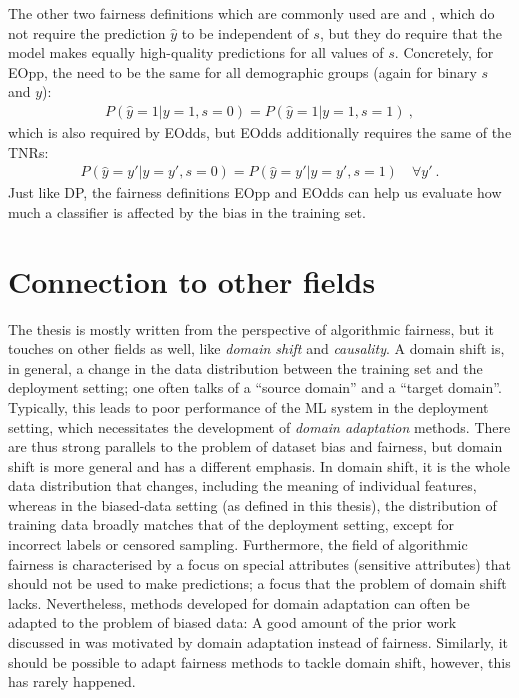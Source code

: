 The other two fairness definitions which are commonly used are  and ,
which do not require the prediction $\hat{y}$ to be independent of $s$,
but they do require that the model makes equally high-quality predictions for all values of $s$.
Concretely, for \ac{EOpp}, the  need to be the same for all demographic groups
(again for binary $s$ and $y$):
\begin{align}
  \label{eq:eopp-def}
  P(\hat{y}=1|y=1,s=0) = P(\hat{y}=1|y=1,s=1)~,
\end{align}
which is also required by \ac{EOdds}, but \ac{EOdds} additionally requires the same of the \acp{TNR}:
\begin{align}
  P(\hat{y}=y'|y=y',s=0) = P(\hat{y}=y'|y=y',s=1)\quad\forall y'~.
  \label{eq:eodds-def}
\end{align}
Just like \ac{DP},
the fairness definitions \ac{EOpp} and \ac{EOdds} can help us evaluate
how much a classifier is affected by the bias in the training set.

\section{Connection to other fields}
The thesis is mostly written from the perspective of algorithmic  fairness, but it touches on other fields as well, like \emph{domain shift} and \emph{causality}.
A domain shift is, in general, a change in the data distribution between the training set and the deployment setting;
one often talks of a ``source domain'' and a ``target domain''.
Typically, this leads to poor performance of the \ac{ML} system in the deployment setting,
which necessitates the development of \emph{domain adaptation} methods.
There are thus strong parallels to the problem of dataset bias and fairness,
but domain shift is more general and has a different emphasis.
In domain shift, it is the whole data distribution that changes, including the meaning of individual features,
whereas in the biased-data setting (as defined in this thesis), the distribution of training data broadly matches that of the deployment setting, except for incorrect labels or censored sampling.
Furthermore, the field of algorithmic fairness is characterised by a focus on special attributes (sensitive attributes) that should not be used to make predictions;
a focus that the problem of domain shift lacks.
Nevertheless, methods developed for domain adaptation can often be adapted to the problem of biased data:
A good amount of the prior work discussed in  was motivated by domain adaptation instead of fairness.
Similarly, it should be possible to adapt fairness methods to tackle domain shift,
however, this has rarely happened.

